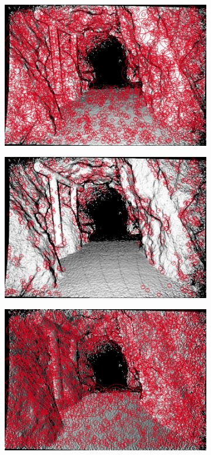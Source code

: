 \begin{figure}[t]
\begin{subfigure}[t]{0.25\linewidth}
    \includegraphics[width=\linewidth]{chapter06/results/SURF/flexion/default_kp0005.png}%
\end{subfigure}%
\begin{subfigure}[t]{0.25\linewidth}
    \includegraphics[width=\linewidth]{chapter06/results/SURF/flexion/oneoctave_kp0005.png}%
\end{subfigure}%
\begin{subfigure}[t]{0.25\linewidth}
    \includegraphics[width=\linewidth]{chapter06/results/SURF/bearing/default_kp0005.png}%

\end{subfigure}
\end{figure}
